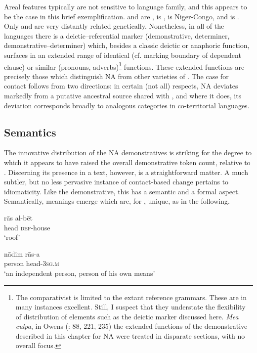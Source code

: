 \documentclass[output=paper]{langsci/langscibook}
\begin{document}
Areal features typically are not sensitive to language family, and this appears to be the case in this brief exemplification.  and  are ,  is ,  is Niger-Congo, and  is . Only  and  are very distantly related genetically. Nonetheless, in all of the languages there is a deictic–referential marker (demonstrative, determiner, demonstrative–determiner) which, besides a classic deictic or anaphoric function, surfaces in an extended range of identical (cf. marking boundary of dependent clause) or similar (pronouns, adverbs)\footnote{The comparativist is limited to the extant reference grammars. These are in many instances excellent. Still, I suspect that they understate the flexibility of distribution of elements such as the deictic marker discussed here. \textit{Mea culpa}, in Owens (\citeyear{Owens1993}: 88, 221, 235) the extended functions of the demonstrative described in this chapter for NA were treated in disparate sections, with no overall focus.} functions. These extended functions are precisely those which distinguish NA from other varieties of . The case for contact follows from two directions: in certain (not all) respects, NA deviates markedly from a putative ancestral source shared with , and where it does, its deviation corresponds broadly to analogous categories in co-territorial languages.

\subsection{Semantics}

The innovative distribution of the NA {demonstratives} is striking for the degree to which it appears to have raised the overall demonstrative token count, {relative} to . Discerning its presence in a text, however, is a straightforward matter. A much subtler, but no less pervasive instance of contact-based change pertains to {idiomaticity}. Like the demonstrative, this has a semantic and a formal aspect. Semantically, meanings emerge which are, for , unique, as in the following.

\ea\label{bet}
\ea
\gll rās al-bēt\\
     head \textsc{def-}house\\
\glt ‘roof’\label{roof}

\ex
\gll nādim rās-a\\
     person head-\textsc{3sg.m}\\
\glt ‘an independent person, person of his own means’\label{nadim}
\z
\z
\end{document}
